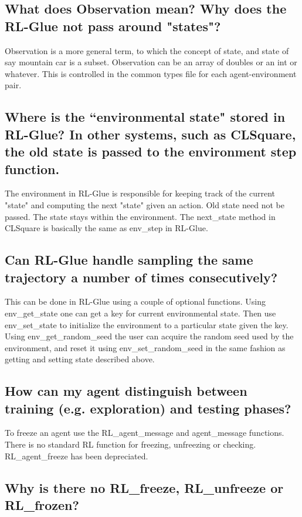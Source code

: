 \documentclass[11pt]{article}
\begin{document}
\subsection{What does Observation mean? Why does the RL-Glue not pass around "states"?}
Observation is a more  general term, to which the concept of state, and state of say mountain car is a subset. Observation can be an array of doubles or an int or whatever. This is controlled in the common types file for each agent-environment pair.


\subsection{Where is the ``environmental state" stored in RL-Glue? In other systems, such as CLSquare, the old state is passed to the environment step function.}
The environment in RL-Glue is responsible for keeping  track of the current "state" and computing the next "state" given an action. Old state need not be passed. The state stays within the  environment. The next\_state method in CLSquare is basically the same as env\_step in RL-Glue.


\subsection{Can RL-Glue handle sampling the same trajectory a number of times consecutively?}
This can be done in RL-Glue using a couple of optional functions. Using env\_get\_state one can get a key for current environmental state. Then use env\_set\_state to initialize the environment to a particular state  given the key. Using env\_get\_random\_seed the user can acquire the random seed used by the environment, and reset it using env\_set\_random\_seed in the same fashion as getting and setting state described above. 

\subsection{How can my agent distinguish between training (e.g. exploration) and testing phases?}
To freeze an agent use the RL\_agent\_message and agent\_message functions. There is no standard RL function for freezing, unfreezing or checking. RL\_agent\_freeze has been depreciated. 

\subsection{Why is there no RL\_freeze, RL\_unfreeze or RL\_frozen?}
\end{document}
